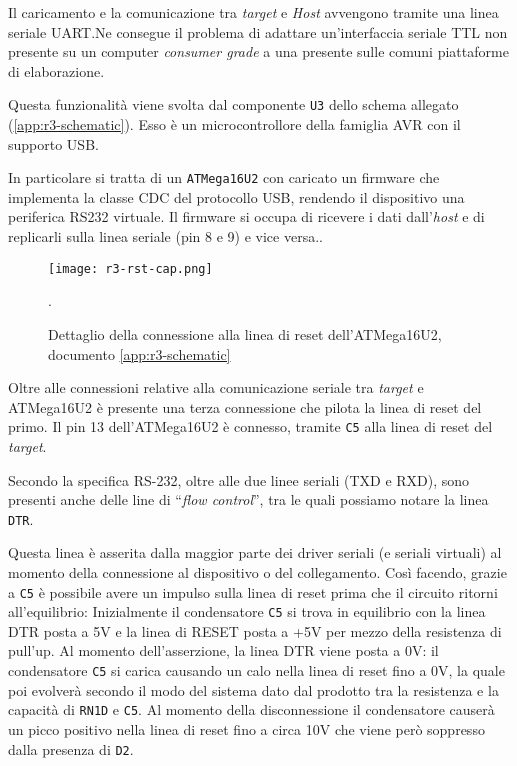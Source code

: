 Il caricamento e la comunicazione tra \textit{target} e \textit{Host} avvengono tramite una linea seriale UART.\@ Ne consegue il problema di adattare un'interfaccia seriale TTL non presente su un computer \textit{consumer grade} a una presente sulle comuni piattaforme di elaborazione.

Questa funzionalità viene svolta dal componente \texttt{U3} dello schema allegato (\ref{app:r3-schematic}). Esso è un microcontrollore della famiglia AVR con il supporto USB.\@

In particolare si tratta di un \texttt{ATMega16U2} con caricato un firmware che implementa la classe CDC del protocollo USB, rendendo il dispositivo una periferica RS232 virtuale.
Il firmware si occupa di ricevere i dati dall'\textit{host} e di replicarli sulla linea seriale (pin 8 e 9) e vice versa.\cite[firmwares/atmegaxxu2/arduino-usbserial/]{git:arduinocore}.

\begin{figure}[t]
    \centering
    \texttt{[image: r3-rst-cap.png]}
    \caption[Dettaglio dello schema elettronico posto in appendice, documento~\ref{app:r3-schematic}]{Dettaglio della connessione alla linea di reset dell'ATMega16U2, documento \ref{app:r3-schematic}~\cite{site:r3-schematic}}\label{fig:r3-schematic-rst-detail}.
\end{figure}


Oltre alle connessioni relative alla comunicazione seriale tra \textit{target} e ATMega16U2 è presente una terza connessione che pilota la linea di reset del primo. Il pin 13 dell'ATMega16U2 è connesso, tramite \texttt{C5} alla linea di reset del \textit{target}.

Secondo la specifica RS-232, oltre alle due linee seriali (TXD e RXD), sono presenti anche delle line di ``\textit{flow control}'', tra le quali possiamo notare la linea \texttt{DTR}.

Questa linea è asserita dalla maggior parte dei driver seriali (e seriali virtuali) al momento della connessione al dispositivo o del collegamento. Così facendo, grazie a \texttt{C5} è possibile avere un impulso sulla linea di reset prima che il circuito ritorni all'equilibrio: Inizialmente il condensatore \texttt{C5} si trova in equilibrio con la linea DTR posta a 5V e la linea di RESET posta a +5V per mezzo della resistenza di pull'up. Al momento dell'asserzione, la linea DTR viene posta a 0V: il condensatore \texttt{C5} si carica causando un calo nella linea di reset fino a 0V, la quale poi evolverà secondo il modo del sistema dato dal prodotto tra la resistenza e la capacità di \texttt{RN1D} e \texttt{C5}.
Al momento della disconnessione il condensatore causerà un picco positivo nella linea di reset fino a circa 10V che viene però soppresso dalla presenza di \texttt{D2}.

